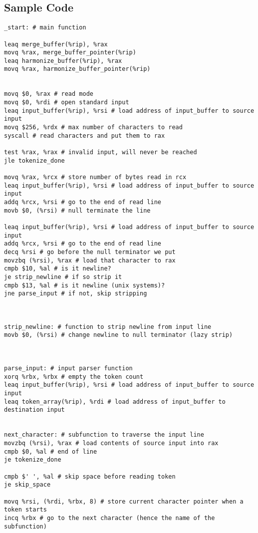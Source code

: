 \documentclass[a4paper,12pt]{article}
\begin{document}
\subsection{Sample Code}
\label{sec:samplecode}
\begin{lstlisting}[style=ATnTStyle]
_start: # main function

leaq merge_buffer(%rip), %rax
movq %rax, merge_buffer_pointer(%rip)
leaq harmonize_buffer(%rip), %rax
movq %rax, harmonize_buffer_pointer(%rip)


movq $0, %rax # read mode
movq $0, %rdi # open standard input
leaq input_buffer(%rip), %rsi # load address of input_buffer to source input
movq $256, %rdx # max number of characters to read
syscall # read characters and put them to rax

test %rax, %rax # invalid input, will never be reached
jle tokenize_done

movq %rax, %rcx # store number of bytes read in rcx
leaq input_buffer(%rip), %rsi # load address of input_buffer to source input
addq %rcx, %rsi # go to the end of read line
movb $0, (%rsi) # null terminate the line

leaq input_buffer(%rip), %rsi # load address of input_buffer to source input
addq %rcx, %rsi # go to the end of read line
decq %rsi # go before the null terminator we put
movzbq (%rsi), %rax # load that character to rax
cmpb $10, %al # is it newline?
je strip_newline # if so strip it
cmpb $13, %al # is it newline (unix systems)?
jne parse_input # if not, skip stripping



strip_newline: # function to strip newline from input line
movb $0, (%rsi) # change newline to null terminator (lazy strip)



parse_input: # input parser function
xorq %rbx, %rbx # empty the token count
leaq input_buffer(%rip), %rsi # load address of input_buffer to source input
leaq token_array(%rip), %rdi # load address of input_buffer to destination input


next_character: # subfunction to traverse the input line
movzbq (%rsi), %rax # load contents of source input into rax
cmpb $0, %al # end of line
je tokenize_done

cmpb $' ', %al # skip space before reading token
je skip_space

movq %rsi, (%rdi, %rbx, 8) # store current character pointer when a token starts
incq %rbx # go to the next character (hence the name of the subfunction)



\end{lstlisting}
\end{document}
